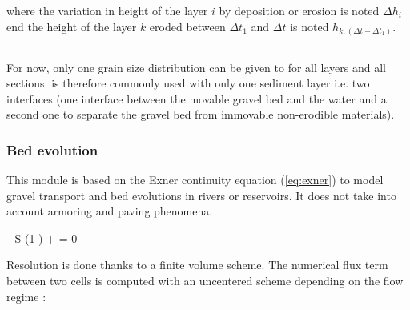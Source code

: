 where the variation in height of the layer $i$ by deposition or erosion is noted $\Delta h_i$ end the height of the layer $k$ eroded between $\Delta t_1$ and $\Delta t$ is noted $h_{k, (\Delta t - \Delta t_1)}$.


\subsection{\Cbedload}
For now, only one grain size distribution can be given to \Cbedload for all layers and all sections. 
\Cbedload is therefore commonly used with only one sediment layer i.e. two interfaces (one interface between the movable gravel bed and the water and a second one to separate the gravel bed from immovable non-erodible materials).
 
\subsubsection{Bed evolution}
 This module is based on the Exner continuity equation (\ref{eq:exner}) to model gravel transport and bed evolutions in rivers or reservoirs. It does not take into account armoring and paving phenomena.

\bequ
     \rho_S (1-\rho)  +  = 0 
     \label{eq:exner}
\eequ

Resolution is done thanks to a finite volume scheme. The numerical flux term between two cells is computed with an uncentered scheme depending on the flow regime \cite{thesis_ung} : 

